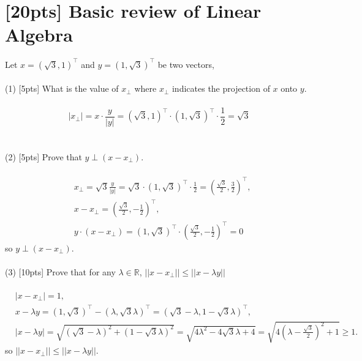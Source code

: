 \documentclass{article}
\begin{document}
\section{[20pts] Basic review of Linear Algebra}
Let $x = (\sqrt{3}, 1)^{\top}$ and $y = (1, \sqrt{3})^{\top}$ be two vectors,\\\\
(1) [5pts] What is the value of $x_{\perp}$ where $x_{\perp}$ indicates the projection of $x$ onto $y$. \\\\
\begin{equation}
    \lvert x_{\perp} \rvert = x \cdot \frac{y}{\lvert y \rvert}=(\sqrt{3}, 1)^{\top}\cdot(1, \sqrt{3})^{\top}\cdot\frac{1}{2}=\sqrt{3}
\end{equation}
\\\\
(2) [5pts] Prove that $y \perp (x - x_{\perp})$.\\\\
\begin{equation}
\begin{split}
    &x_{\perp}=\sqrt{3}\frac{y}{\lvert y \rvert}=\sqrt{3}\cdot(1, \sqrt{3})^{\top}\cdot\frac{1}{2}=(\frac{\sqrt{3}}{2}, \frac{3}{2})^{\top},
    \\&x-x_{\perp}=(\frac{\sqrt{3}}{2}, -\frac{1}{2})^{\top},
    \\&y\cdot(x-x_{\perp})=(1, \sqrt{3})^{\top}\cdot(\frac{\sqrt{3}}{2}, -\frac{1}{2})^{\top}=0
\end{split}
\end{equation}
so $y \perp (x - x_{\perp})$.
\\\\
(3) [10pts] Prove that for any $\lambda \in \mathbb{R}$, $\lvert| x - x_{\perp}\rvert| \leq \lvert| x - \lambda y \rvert|$ \\\\
\begin{equation}
\begin{aligned}
    &\lvert x-x_{\perp} \rvert=1,
    \\&x-\lambda y=(1, \sqrt{3})^{\top}-(\lambda, \sqrt{3}\lambda)^{\top}=(\sqrt{3}-\lambda, 1-\sqrt{3}\lambda)^{\top},
    \\&\lvert x-\lambda y \rvert=\sqrt{(\sqrt{3}-\lambda)^2+(1-\sqrt{3}\lambda)^2}
    =\sqrt{4\lambda^2-4\sqrt{3}\lambda+4}=\sqrt{4(\lambda-\frac{\sqrt{3}}{2})^2+1}
    \geq 1.
\end{aligned}
\end{equation}
so $\lvert| x - x_{\perp}\rvert| \leq \lvert| x - \lambda y \rvert|$.
\end{document}

